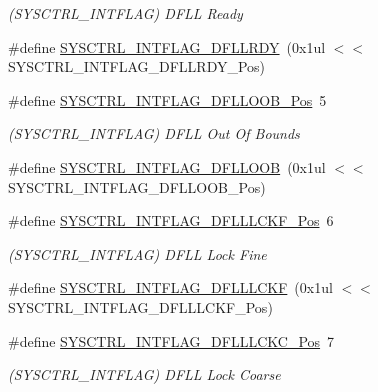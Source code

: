 \begin{DoxyCompactItemize}
\begin{DoxyCompactList}\small\item\em (S\+Y\+S\+C\+T\+R\+L\+\_\+\+I\+N\+T\+F\+L\+AG) D\+F\+LL Ready \end{DoxyCompactList}\item 
\#define \mbox{\hyperlink{group___s_a_m_d21___s_y_s_c_t_r_l_gaa82cade9fd4299042acb4c60e0338067}{S\+Y\+S\+C\+T\+R\+L\+\_\+\+I\+N\+T\+F\+L\+A\+G\+\_\+\+D\+F\+L\+L\+R\+DY}}~(0x1ul $<$$<$ S\+Y\+S\+C\+T\+R\+L\+\_\+\+I\+N\+T\+F\+L\+A\+G\+\_\+\+D\+F\+L\+L\+R\+D\+Y\+\_\+\+Pos)
\item 
\#define \mbox{\hyperlink{group___s_a_m_d21___s_y_s_c_t_r_l_ga2712f2484ecc015175a6d69c18179063}{S\+Y\+S\+C\+T\+R\+L\+\_\+\+I\+N\+T\+F\+L\+A\+G\+\_\+\+D\+F\+L\+L\+O\+O\+B\+\_\+\+Pos}}~5
\begin{DoxyCompactList}\small\item\em (S\+Y\+S\+C\+T\+R\+L\+\_\+\+I\+N\+T\+F\+L\+AG) D\+F\+LL Out Of Bounds \end{DoxyCompactList}\item 
\#define \mbox{\hyperlink{group___s_a_m_d21___s_y_s_c_t_r_l_gaf34ba145615d7556e204c67386a1de01}{S\+Y\+S\+C\+T\+R\+L\+\_\+\+I\+N\+T\+F\+L\+A\+G\+\_\+\+D\+F\+L\+L\+O\+OB}}~(0x1ul $<$$<$ S\+Y\+S\+C\+T\+R\+L\+\_\+\+I\+N\+T\+F\+L\+A\+G\+\_\+\+D\+F\+L\+L\+O\+O\+B\+\_\+\+Pos)
\item 
\#define \mbox{\hyperlink{group___s_a_m_d21___s_y_s_c_t_r_l_gac12858520099ea16c39fb0affdd03ff5}{S\+Y\+S\+C\+T\+R\+L\+\_\+\+I\+N\+T\+F\+L\+A\+G\+\_\+\+D\+F\+L\+L\+L\+C\+K\+F\+\_\+\+Pos}}~6
\begin{DoxyCompactList}\small\item\em (S\+Y\+S\+C\+T\+R\+L\+\_\+\+I\+N\+T\+F\+L\+AG) D\+F\+LL Lock Fine \end{DoxyCompactList}\item 
\#define \mbox{\hyperlink{group___s_a_m_d21___s_y_s_c_t_r_l_ga5f52ae3f02a100591ecaf73a72b7579f}{S\+Y\+S\+C\+T\+R\+L\+\_\+\+I\+N\+T\+F\+L\+A\+G\+\_\+\+D\+F\+L\+L\+L\+C\+KF}}~(0x1ul $<$$<$ S\+Y\+S\+C\+T\+R\+L\+\_\+\+I\+N\+T\+F\+L\+A\+G\+\_\+\+D\+F\+L\+L\+L\+C\+K\+F\+\_\+\+Pos)
\item 
\#define \mbox{\hyperlink{group___s_a_m_d21___s_y_s_c_t_r_l_ga6d907797a44311c11e7eb558dedc2346}{S\+Y\+S\+C\+T\+R\+L\+\_\+\+I\+N\+T\+F\+L\+A\+G\+\_\+\+D\+F\+L\+L\+L\+C\+K\+C\+\_\+\+Pos}}~7
\begin{DoxyCompactList}\small\item\em (S\+Y\+S\+C\+T\+R\+L\+\_\+\+I\+N\+T\+F\+L\+AG) D\+F\+LL Lock Coarse \end{DoxyCompactList}\item 
$$
\end{DoxyCompactItemize}
